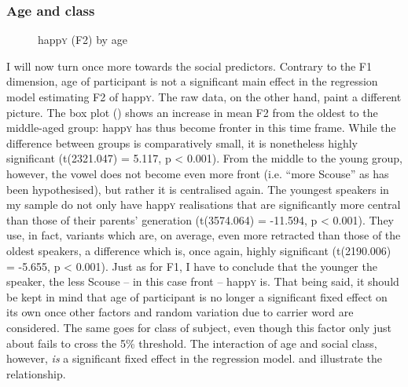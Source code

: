 \subsubsection{Age and class}
\label{sec.prod.res.vow.happy.f2.ageclass}

\begin{figure}
	
		\resizebox{.5\linewidth}{!}{} 
	\caption{happ\textsc{y} (F2) by age}
	\label{fig.box.f2w.happy.tot}
\end{figure}

I will now turn once more towards the social predictors.
Contrary to the F1 dimension, age of participant is not a significant main effect in the regression model estimating F2 of happ\textsc{y}.
The raw data, on the other hand, paint a different picture.
The box plot () shows an increase in mean F2 from the oldest to the middle-aged group: happ\textsc{y} has thus become fronter in this time frame.
While the difference between groups is comparatively small, it is nonetheless highly significant (t(2321.047) = 5.117, p < 0.001).
From the middle to the young group, however, the vowel does not become even more front (i.e. ``more Scouse'' as has been hypothesised), but rather it is centralised again.
The youngest speakers in my sample do not only have happ\textsc{y} realisations that are significantly more central than those of their parents' generation (t(3574.064) = -11.594, p < 0.001).
They use, in fact, variants which are, on average, even more retracted than those of the oldest speakers, a difference which is, once again, highly significant (t(2190.006) = -5.655, p < 0.001).
Just as for F1, I have to conclude that the younger the speaker, the less Scouse -- in this case front -- happ\textsc{y} is.
That being said, it should be kept in mind that age of participant is no longer a significant fixed effect on its own once other factors and random variation due to carrier word are considered.
The same goes for class of subject, even though this factor only just about fails to cross the 5\% threshold.
The interaction of age and social class, however, \emph{is} a significant fixed effect in the regression model.
 and  illustrate the relationship.

